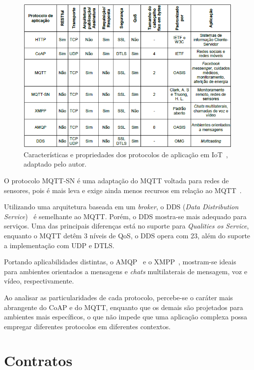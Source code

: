 \begin{figure}[ht]
	\centering
	\includegraphics[width=1\textwidth]{imagens/tabela_protocolos.png}
	\caption{Características e propriedades dos protocolos de aplicação em IoT~\cite{sankarinternet}, adaptado pelo autor.
		\label{fig:tabela_protocolos}}
\end{figure}
\FloatBarrier

O protocolo MQTT-SN é uma adaptação do MQTT voltada para redes de sensores, pois é mais leva e exige ainda menos recursos em relação ao MQTT~\cite{stanford2013mqtt}.

Utilizando uma arquitetura baseada em um \textit{broker}, o DDS (\textit{Data Distribution Service})~\cite{dds2015specifi} é semelhante ao MQTT. Porém, o DDS mostra-se mais adequado para serviços. Uma das principais diferenças está no suporte para \textit{Qualities os Service}, enquanto o MQTT detêm 3 níveis de QoS, o DDS opera com 23, além do suporte a implementação com UDP e DTLS.

Portando aplicabilidades distintas, o AMQP~\cite{amqp2012oasis} e o XMPP~\cite{xmpp2011extensible}, mostram-se ideais para ambientes orientados a mensagens e \textit{chats} multilaterais de mensagem, voz e vídeo, respectivamente.

Ao analisar as particularidades de cada protocolo, percebe-se o caráter mais abrangente do CoAP e do MQTT, enquanto que os demais são projetados para ambientes mais específicos, o que não impede que uma aplicação complexa possa empregar diferentes protocolos em diferentes contextos.   

\section{Contratos}

